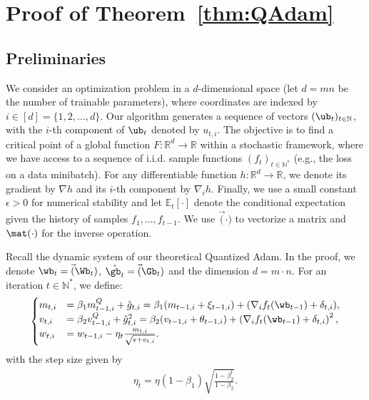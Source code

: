 \documentclass[11pt, letterpaper]{article}
\begin{document}
\newpage
\tableofcontents
\resettocdepth{}
\newpage

\section{Proof of Theorem~\ref{thm:QAdam}}\label{app:Proof_QAdam}
\subsection{Preliminaries}\label{equal}
We consider an optimization problem in a $d$-dimensional space (let $d=mn$ be the number of trainable parameters), where coordinates are indexed by $i \in [d] = \{1, 2, \ldots, d\}$. Our algorithm generates a sequence of vectors $(\ub_t)_{t\in\mathbb{N}}$, with the $i$-th component of $\ub_t$ denoted by $u_{t,i}$. The objective is to find a critical point of a global function $F: \mathbb{R}^d \rightarrow \mathbb{R}$ within a stochastic framework, where we have access to a sequence of i.i.d. sample functions $(f_t)_{t \in \mathbb{N}^*}$ (e.g., the loss on a data minibatch). For any differentiable function $h: \mathbb{R}^d \rightarrow \mathbb{R}$, we denote its gradient by $\nabla h$ and its $i$-th component by $\nabla_i h$. Finally, we use a small constant $\epsilon > 0$ for numerical stability and let $\mathbb{E}_t[\cdot]$ denote the conditional expectation given the history of samples $f_1, \ldots, f_{t-1}$. We use $\vec(\cdot)$ to vectorize a matrix and $\mat(\cdot)$ for the inverse operation.

Recall the dynamic system of our theoretical Quantized Adam. In the proof, we denote $\wb_t=\vec(\Wb_t)$, $\hat{\gb_t}=\vec(\Gb_t)$ and the dimension $d=m \cdot n$. For an iteration $t \in \mathbb{N}^*$, we define:
\begin{align}
    \label{app:eq:system}
    \begin{cases}
    m_{t, i} &= \beta_1  m_{t-1, i}^Q+ \hat{g}_{t,i}=\beta_1 ( m_{t-1, i}+\xi_{t-1,i}) + (\nabla_i f_t(\wb_{t-1})+\delta_{t,i}),\\
    v_{t, i} &= \beta_2  v_{t-1, i}^Q + \hat{g}_{t,i}^2=\beta_2 (v_{t-1, i}+\theta_{t-1,i}) + \left(\nabla_i f_t(\wb_{t-1})+\delta_{t,i}\right)^2,\\
    w_{t, i} &= w_{t-1, i} - \eta_t \frac{m_{t, i}}{\sqrt{\epsilon + v_{t, i}}}.
    \end{cases}
\end{align}
with the step size given by
\begin{align}
\label{app:eq:alpha_adam}
    \eta_t = \eta (1 - \beta_1) \sqrt{\frac{1-\beta_2^t}{1 - \beta_2}}.
\end{align}
\end{document}
